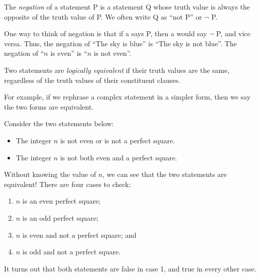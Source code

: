 \documentclass{tufte-book}
\begin{document}
\begin{definition}
  The \emph{negation} of a statement P is a statement Q whose truth value is always the opposite of the truth value of P. We often write Q as ``not P'' or $\neg$ P.
\end{definition}
One way to think of negation is that if a \knave says P, then a \knight would say $\neg$ P, and vice versa. Thus, the negation of ``The sky is blue'' is ``The sky is not blue''. The negation of ``$n$ is even'' is ``$n$ is not even''.

\begin{definition}
  Two statements are \emph{logically equivalent}  if their truth values are the same, regardless of the truth values of their constituent clauses. 
\end{definition}
For example, if we rephrase a complex statement in a simpler form, then we say the two forms are equivalent. 

\begin{example}
  Consider the two statements below:
  \begin{itemize}
      \item The integer $n$ is not even or is not a perfect square.
      \item The integer $n$ is not both even and a perfect square.
  \end{itemize}
  Without knowing the value of $n$, we can see that the two statements are equivalent! There are four cases to check:
  \begin{enumerate}
      \item $n$ is an even perfect square;
      \item $n$ is an odd perfect square;
      \item $n$ is even and not a perfect square; and
      \item $n$ is odd and not a perfect square.
  \end{enumerate}
  It turns out that both statements are false in case 1, and true in every other case.
\end{example}
\end{document}
